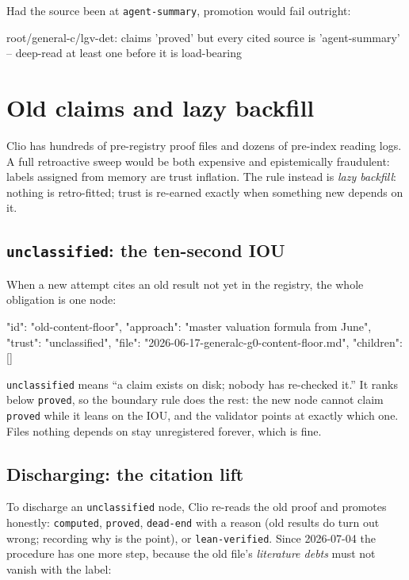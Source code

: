 \documentclass[11pt,a4paper]{article}
\newcommand{\level}[1]{\texttt{#1}}
\begin{document}
Had the source been at \level{agent-summary}, promotion would fail outright:

\begin{code}
root/general-c/lgv-det: claims 'proved' but every cited source
is 'agent-summary' -- deep-read at least one before it is
load-bearing
\end{code}

\section{Old claims and lazy backfill}
\label{sec:lazy}

Clio has hundreds of pre-registry proof files and dozens of pre-index
reading logs. A full retroactive sweep would be both expensive and
epistemically fraudulent: labels assigned from memory are trust inflation.
The rule instead is \emph{lazy backfill}: nothing is retro-fitted; trust is
re-earned exactly when something new depends on it.

\subsection{\texttt{unclassified}: the ten-second IOU}

When a new attempt cites an old result not yet in the registry, the whole
obligation is one node:

\begin{code}
{ "id": "old-content-floor",
  "approach": "master valuation formula from June",
  "trust": "unclassified",
  "file": "2026-06-17-generalc-g0-content-floor.md",
  "children": [] }
\end{code}

\level{unclassified} means ``a claim exists on disk; nobody has re-checked
it.'' It ranks below \level{proved}, so the boundary rule does the rest: the
new node cannot claim \level{proved} while it leans on the IOU, and the
validator points at exactly which one. Files nothing depends on stay
unregistered forever, which is fine.

\subsection{Discharging: the citation lift}

To discharge an \level{unclassified} node, Clio re-reads the old proof and
promotes honestly: \level{computed}, \level{proved}, \level{dead-end} with a
reason (old results do turn out wrong; recording why is the point), or
\level{lean-verified}. Since 2026-07-04 the procedure has one more step,
because the old file's \emph{literature debts} must not vanish with the
label:
\end{document}
